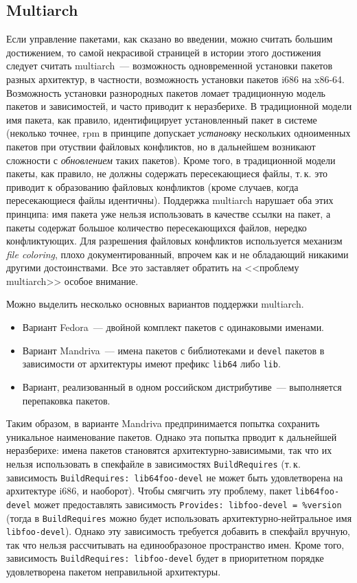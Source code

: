 \documentclass[russian,a4paper,12pt,titlepage]{article}
\begin{document}
\subsection{Multiarch}
Если управление пакетами, как сказано во введении, можно считать большим достижением, то самой некрасивой страницей
в истории этого достижения следует считать multiarch~--- возможность одновременной установки пакетов разных архитектур,
в частности, возможность установки пакетов i686 на x86-64.  Возможность установки разнородных пакетов ломает традиционную
модель пакетов и зависимостей, и часто приводит к неразберихе.  В традиционной модели имя пакета, как правило, идентифицирует
установленный пакет в системе (неколько точнее, rpm в принципе допускает \emph{установку} нескольких одноименных пакетов
при отуствии файловых конфликтов, но в дальнейшем возникают сложности с \emph{обновлением} таких пакетов).  Кроме того,
в традиционной модели пакеты, как правило, не должны содержать пересекающиеся файлы, т.\,к. это приводит к образованию файловых
конфликтов (кроме случаев, когда пересекающиеся файлы идентичны).  Поддержка multiarch нарушает оба этих принципа: имя пакета
уже нельзя использовать в качестве ссылки на пакет, а пакеты содержат большое количество пересекающихся файлов, нередко конфликтующих.
Для разрешения файловых конфликтов используется механизм \emph{file coloring}, плохо документированный, впрочем как и не
обладающий никакими другими достоинствами.  Все это заставляет обратить на <<проблему multiarch>> особое внимание.

Можно выделить несколько основных вариантов поддержки multiarch.
\begin{itemize}
\item Вариант Fedora~--- двойной комплект пакетов с одинаковыми именами.
\item Вариант Mandriva~--- имена пакетов с библиотеками и \verb|devel| пакетов в зависимости от архитектуры
имеют префикс \verb|lib64| либо \verb|lib|.
\item Вариант, реализованный в одном российском дистрибутиве~--- выполняется перепаковка пакетов.
\end{itemize}

Таким образом, в варианте Mandriva предпринимается попытка сохранить уникальное наименование пакетов.  Однако эта
попытка прводит к дальнейшей неразберихе: имена пакетов становятся архитектурно-зависимыми, так что их нельзя
использовать в спекфайле в зависимостях \verb|BuildRequires| (т.\,к. зависимость \texttt{BuildRequires: lib64foo-devel}
не может быть удовлетворена на архитектуре i686, и наоборот).  Чтобы смягчить эту проблему, пакет \verb|lib64foo-devel|
может предоставлять зависимость \verb|Provides: libfoo-devel = %version| (тогда в \verb|BuildRequires| можно будет использовать
архитектурно-нейтральное имя \verb|libfoo-devel|).  Однако эту зависимость требуется добавить в спекфайл вручную,
так что нельзя рассчитывать на единообразоное пространство имен.  Кроме того, зависимость \texttt{BuildRequires: libfoo-devel}
будет в приоритетном порядке удовлетворена пакетом неправильной архитектуры.
\end{document}
